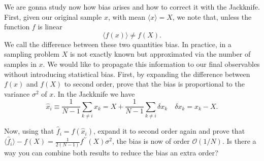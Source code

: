 We are gonna study now how bias arises and how to correct it with the Jackknife. First, given our original sample $x$, with mean $\langle x \rangle =X$, we note that, unless the function $f$ is linear
\begin{equation}
\langle f(x) \rangle \neq f(X).
\end{equation}
We call the difference between these two quantities bias. In practice, in a sampling problem $X$ is not exactly known but approximated via the number of samples in $x$. We would like to propagate this information to our final observables without introducing statistical bias. 
First, by  expanding the difference between $f(x)$ and $f(X)$ to second order, prove that the bias is proportional to the variance $\sigma^2$ of $x$.
In the Jackknife we have
\begin{equation}
\widehat{x}_i \equiv \frac{1}{N-1} \sum_{k \neq i} x_k=X+\frac{1}{N-1} \sum_{k \neq i} \delta x_k \quad  \delta x_k=x_k-X.
\end{equation}

Now, using that $\widehat{f}_i=f(\widehat{x}_i)$, expand it to second order again and prove that $\langle \widehat{f}_i \rangle-f(X)=\frac{1}{2(N-1)} f^{\prime \prime}(X) \sigma^2$, the bias is now of order $\mathcal{O}(1/N)$. Is there a way you can combine both results to reduce the bias an extra order?
